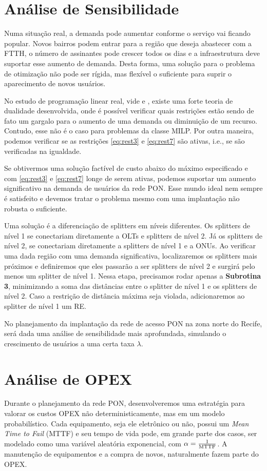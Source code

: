 \documentclass[12pt]{article}
\begin{document}
\section{Análise de Sensibilidade}
Numa situação real, a demanda pode aumentar conforme o serviço vai ficando popular. Novos bairros podem entrar para a região que deseja abastecer com a FTTH, o número de assinantes pode crescer todos os dias e a infraestrutura deve suportar esse aumento de demanda. Desta forma, uma solução para o problema de otimização não pode ser rígida, mas flexível o suficiente para suprir o aparecimento de novos usuários. 

No estudo de programação linear real, vide \cite{linear} e \cite{papad}, existe uma forte teoria de dualidade desenvolvida, onde é possível verificar quais restrições estão sendo de fato um gargalo para o aumento de uma demanda ou diminuição de um recurso. Contudo, esse não é o caso para problemas da classe MILP. Por outra maneira, podemos verificar se as restrições \ref{eq:rest3} e \ref{eq:rest7} são ativas, i.e., se são verificadas na igualdade.

Se obtivermos uma solução factível de custo abaixo do máximo especificado e com \ref{eq:rest3} e \ref{eq:rest7} longe de serem ativas, podemos suportar um aumento significativo na demanda de usuários da rede PON. Esse mundo ideal nem sempre é satisfeito e devemos tratar o problema mesmo com uma implantação não robusta o suficiente. 

Uma solução é a diferenciação de splitters em níveis diferentes. Os splitters de nível 1 se conectariam diretamente a OLTs e splitters de nível 2. Já os splitters de nível 2, se conectariam diretamente a splitters de nível 1 e a ONUs. Ao verificar uma dada região com uma demanda significativa, localizaremos os splitters mais próximos e definiremos que eles passarão a ser splitters de nível 2 e surgirá pelo menos um splitter de nível 1. Nessa etapa, precisamos rodar apenas a \textbf{Subrotina 3}, minimizando a soma das distâncias entre o splitter de nível 1 e os splitters de nível 2. Caso a restrição de distância máxima seja violada, adicionaremos ao splitter de nível 1 um RE.

No planejamento da implantação da rede de acesso PON na zona norte do Recife, será dada uma análise de sensibilidade mais aprofundada, simulando o crescimento de usuários a uma certa taxa $\lambda$.
\section{Análise de OPEX}
Durante o planejamento da rede PON, desenvolveremos uma estratégia para valorar os custos OPEX não deterministicamente, mas em um modelo probabilístico. Cada equipamento, seja ele eletrônico ou não, possui um \textit{Mean Time to Fail} (MTTF) e seu tempo de vida pode, em grande parte dos casos, ser modelado como uma variável aleatória exponencial, com $\alpha = \frac{1}{\rm MTTF}$. A manutenção de equipamentos e a compra de novos, naturalmente fazem parte do OPEX.
\end{document}
